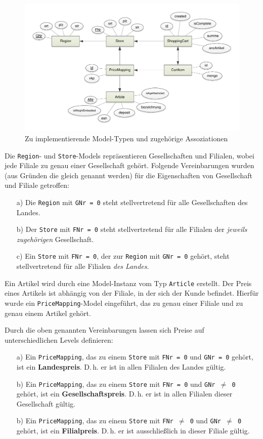 \begin{figure}[H]
\includegraphics[width=\linewidth]{res/entwurf-models.pdf}
\caption{Zu implementierende Model-Typen und zugehörige Assoziationen}\label{abb:models}
\end{figure}

Die \texttt{Region}- und \texttt{Store}-Models repräsentieren Gesellschaften und Filialen, wobei jede Filiale zu genau einer Gesellschaft gehört. Folgende Vereinbarungen wurden (aus Gründen die gleich genannt werden) für die Eigenschaften von Gesellschaft und Filiale getroffen:
\begin{itemize}
	\item[a)] Die \texttt{Region} mit \texttt{GNr = 0} steht stellvertretend für alle Gesellschaften des Landes.
	\item[b)] Der \texttt{Store} mit \texttt{FNr = 0} steht stellvertretend für alle Filialen der \textit{jeweils zugehörigen} Gesellschaft.
	\item[c)] Ein \texttt{Store} mit \texttt{FNr = 0}, der zur \texttt{Region} mit \texttt{GNr = 0} gehört, steht stellvertretend für alle Filialen \textit{des Landes}.
\end{itemize}

Ein Artikel wird durch eine Model-Instanz vom Typ \texttt{Article} erstellt. Der Preis eines Artikels ist abhängig von der Filiale, in der sich der Kunde befindet. Hierfür wurde ein \texttt{PriceMapping}-Model eingeführt, das zu genau einer Filiale und zu genau einem Artikel gehört.

Durch die oben genannten Vereinbarungen lassen sich Preise auf unterschiedlichen Levels definieren:
\begin{itemize}
	\item[a)] Ein \texttt{PriceMapping}, das zu einem \texttt{Store} mit \texttt{FNr = 0} und \texttt{GNr = 0} gehört, ist ein \textbf{Landespreis}. D.\,h. er ist in allen Filialen des Landes gültig.
	\item[b)] Ein \texttt{PriceMapping}, das zu einem \texttt{Store} mit \texttt{FNr = 0} und \texttt{GNr $\neq$ 0} gehört, ist ein \textbf{Gesellschaftspreis}. D.\,h. er ist in allen Filialen dieser Gesellschaft gültig.
	\item[b)] Ein \texttt{PriceMapping}, das zu einem \texttt{Store} mit \texttt{FNr $\neq$ 0} und \texttt{GNr $\neq$ 0} gehört, ist ein \textbf{Filialpreis}. D.\,h. er ist ausschließlich in dieser Filiale gültig.
\end{itemize}

